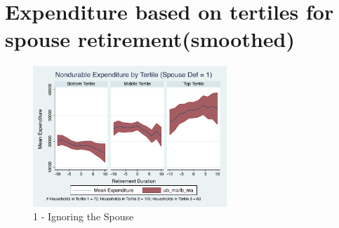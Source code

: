 \documentclass[11pt,onecolumn]{article}
\numberwithin{figure}{section}
\begin{document}
\clearpage


\section{Expenditure based on tertiles for spouse retirement(smoothed)}

\begin{figure}[h]
	\caption{1 - Ignoring the Spouse}
	\centering
	\includegraphics[width=0.65\textwidth]{../ConsumptionPostRetirement_by_SpouseDef/Smoothed/spouse_def_1.pdf}
\end{figure}
\end{document}

